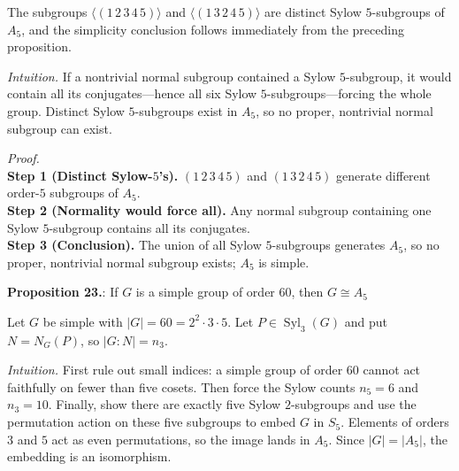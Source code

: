 \documentclass[12pt]{article}
\theoremstyle{definition}
\newcommand{\Syl}{\operatorname{Syl}}
\begin{document}
\newpage

The subgroups $\langle(1\,2\,3\,4\,5)\rangle$ and $\langle(1\,3\,2\,4\,5)\rangle$ are distinct Sylow $5$-subgroups of $A_5$, and the simplicity conclusion follows immediately from the preceding proposition.\\

\dotfill

\emph{Intuition.} If a nontrivial normal subgroup contained a Sylow $5$-subgroup, it would contain all its conjugates—hence all six Sylow $5$-subgroups—forcing the whole group. Distinct Sylow $5$-subgroups exist in $A_5$, so no proper, nontrivial normal subgroup can exist.

\dotfill

\emph{Proof.}\\
\textbf{Step 1 (Distinct Sylow-$5$’s).} $(1\,2\,3\,4\,5)$ and $(1\,3\,2\,4\,5)$ generate different order-$5$ subgroups of $A_5$.\\
\textbf{Step 2 (Normality would force all).} Any normal subgroup containing one Sylow $5$-subgroup contains all its conjugates.\\
\textbf{Step 3 (Conclusion).} The union of all Sylow $5$-subgroups generates $A_5$, so no proper, nontrivial normal subgroup exists; $A_5$ is simple.\\

\newpage




\noindent\textbf{Proposition 23.}: If $G$ is a simple group of order $60$, then $G\cong A_5$

\newpage

Let $G$ be simple with $|G|=60=2^2\cdot3\cdot5$. Let $P\in\Syl_3(G)$ and put $N=N_G(P)$, so $|G:N|=n_3$.\\

\dotfill

\emph{Intuition.} First rule out small indices: a simple group of order $60$ cannot act faithfully on fewer than five cosets. Then force the Sylow counts $n_5=6$ and $n_3=10$. Finally, show there are exactly five Sylow $2$-subgroups and use the permutation action on these five subgroups to embed $G$ in $S_5$. Elements of orders $3$ and $5$ act as even permutations, so the image lands in $A_5$. Since $|G|=|A_5|$, the embedding is an isomorphism.

\dotfill
\end{document}
